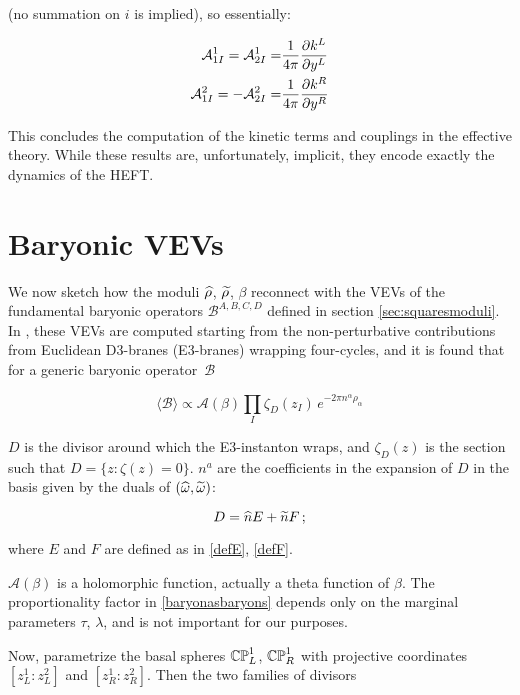 (no summation on $i$ is implied), so essentially:

\begin{align}
	\mathcal{A}_{1I}^1 = \mathcal{A}_{2I}^1 = & \frac{1}{4\pi} \frac{\partial k^L}{\partial y^L} \\
	\mathcal{A}_{1I}^2 = - \mathcal{A}_{2I}^2 = & \frac{1}{4\pi} \frac{\partial k^R}{\partial y^R} 
	\label{}
\end{align}

This concludes the computation of the kinetic terms and couplings in the effective theory. While these results are, unfortunately, implicit, they encode exactly the dynamics of the HEFT.

\section{Baryonic VEVs}

We now sketch how the moduli $\widehat{\rho}$, $\widetilde{\rho}$, $\beta$ reconnect with the VEVs of the fundamental baryonic operators $\mathcal{B}^{A,B,C,D}$ defined in section \ref{sec:squaresmoduli}. In \cite{MZ}, these VEVs are computed starting from the non-perturbative contributions from Euclidean D3-branes (E3-branes) wrapping four-cycles, and it is found that for a generic baryonic o\-pe\-ra\-tor~$\mathcal{B}$

\begin{equation}
	\langle \mathcal{B} \rangle \propto \mathcal{A}(\beta) \prod_I \zeta_D(z_I) \, e^{-2\pi n^\alpha \rho_\alpha}
	\label{baryonasbaryons}
\end{equation}

$D$ is the divisor around which the E3-instanton wraps, and $\zeta_D(z)$ is the section such that $D = \{z :  \zeta(z) = 0\}$. $n^a$ are the coefficients in the expansion of $D$ in the basis given by the duals of $(\widehat{\omega},\widetilde{\omega})$:

\begin{equation}
	D = \widehat{n} E + \widetilde{n} F\,;
	\label{}
\end{equation}

where $E$ and $F$ are defined as in \eqref{defE}, \eqref{defF}.

$\mathcal{A}(\beta)$ is a holomorphic function, actually a theta function of $\beta$. The proportionality factor in \eqref{baryonasbaryons} depends only on the marginal parameters $\tau$, $\lambda$, and is not important for our purposes.

Now, parametrize the basal spheres $\mathbb{CP}^1_L$, $\mathbb{CP}^1_R$ with projective coordinates $[z_L^1 : z_L^2]$ and $[z_R^1 : z_R^2]$. Then the two families of divisors

